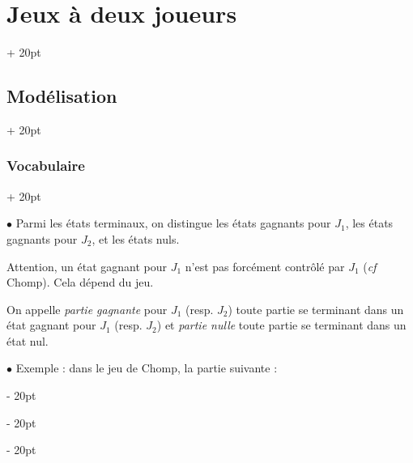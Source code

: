 \documentclass[a4paper, 12pt, twoside]{article}
\newcommand{\ind}[1][20pt]{\advance\leftskip + #1}
\newcommand{\deind}[1][20pt]{\advance\leftskip - #1}
\newenvironment{indt}[2][20pt]{#2 \par \ind[#1]}{\par \deind} %
\begin{document}
\begin{indt}{\section{Jeux à deux joueurs}}
\begin{indt}{\subsection{Modélisation}}
\begin{indt}{\subsubsection{Vocabulaire}}
                \vspace{12pt}
                
                $\bullet$ Parmi les états terminaux, on distingue les états gagnants pour $J_1$, les états gagnants pour $J_2$, et les états nuls.

                Attention, un état gagnant pour $J_1$ n'est pas forcément contrôlé par $J_1$ (\textit{cf} Chomp). Cela dépend du jeu.

                On appelle \emph{partie gagnante} pour $J_1$ (resp. $J_2$) toute partie se terminant dans un état gagnant pour $J_1$ (resp. $J_2$) et \emph{partie nulle} toute partie se terminant dans un état nul.

                \vspace{12pt}
                
                $\bullet$ Exemple : dans le jeu de Chomp, la partie suivante :

                \begin{center}
\end{center}
\end{indt}
\end{indt}
\end{indt}
\end{document}
